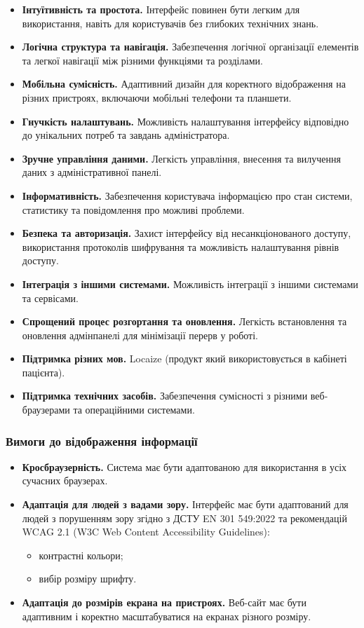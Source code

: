 \documentclass{article}
\begin{document}
\begin{itemize}
    \item \textbf{Інтуїтивність та простота.} Інтерфейс повинен бути легким для використання, навіть для користувачів без глибоких технічних знань.
    \item \textbf{Логічна структура та навігація.} Забезпечення логічної організації елементів та легкої навігації між різними функціями та розділами.
    \item \textbf{Мобільна сумісність.} Адаптивний дизайн для коректного відображення на різних пристроях, включаючи мобільні телефони та планшети.
    \item \textbf{Гнучкість налаштувань.} Можливість налаштування інтерфейсу відповідно до унікальних потреб та завдань адміністратора.
    \item \textbf{Зручне управління даними.} Легкість управління, внесення та вилучення даних з адміністративної панелі.
    \item \textbf{Інформативність.} Забезпечення користувача інформацією про стан системи, статистику та повідомлення про можливі проблеми.
    \item \textbf{Безпека та авторизація.} Захист інтерфейсу від несанкціонованого доступу, використання протоколів шифрування та можливість налаштування рівнів доступу.
    \item \textbf{Інтеграція з іншими системами.} Можливість інтеграції з іншими системами та сервісами.
    \item \textbf{Спрощений процес розгортання та оновлення.} Легкість встановлення та оновлення адмінпанелі для мінімізації перерв у роботі.
    \item \textbf{Підтримка різних мов.} Locaize (продукт який використовується в кабінеті пацієнта).
    \item \textbf{Підтримка технічних засобів.} Забезпечення сумісності з різними веб-браузерами та операційними системами.
\end{itemize}

\subsubsection{Вимоги до відображення інформації}

\begin{itemize}
    \item \textbf{Кросбраузерність.} Система має бути адаптованою для використання в усіх сучасних браузерах.
    \item \textbf{Адаптація для людей з вадами зору.} Інтерфейс має бути адаптований для людей з порушенням зору згідно з ДСТУ EN 301 549:2022 та рекомендацій WCAG 2.1 (W3C Web Content Accessibility Guidelines):
    \begin{itemize}
        \item контрастні кольори;
        \item вибір розміру шрифту.
    \end{itemize}
    \item \textbf{Адаптація до розмірів екрана на пристроях.} Веб-сайт має бути адаптивним і коректно масштабуватися на екранах різного розміру.
\end{itemize}
\end{document}
